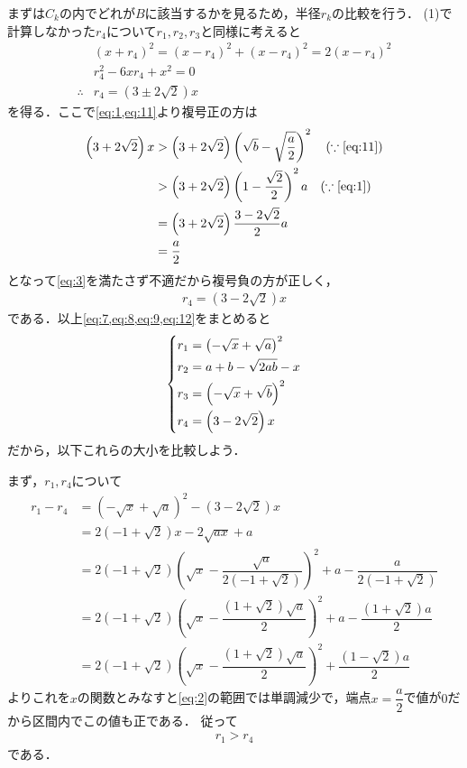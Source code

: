 \documentclass[../../main.tex]{subfiles}
\begin{document}
まずは$C_k$の内でどれが$B$に該当するかを見るため，半径$r_k$の比較を行う．
(1)で計算しなかった$r_4$について$r_1,r_2,r_3$と同様に考えると
\begin{align}
  &(x+r_4)^2 = (x-r_4)^2 + (x-r_4)^2 = 2(x-r_4)^2\\
  & r_4^2-6xr_4 + x^2 = 0 \\
  \therefore
  & r_4 = \left(3\pm 2\sqrt{2}\right) x
\end{align}
を得る．ここで\cref{eq:1,eq:11}より複号正の方は
\begin{align}
  \left(3+ 2\sqrt{2}\right) x
  & > \left(3+ 2\sqrt{2}\right)\left(\sqrt{b} - \sqrt{\dfrac{a}{2}}\right)^2 \quad (\because\text{\cref{eq:11}}) \\
  & > \left(3+ 2\sqrt{2}\right)\left(1 - \dfrac{\sqrt{2}}{2}\right)^2 a \quad (\because\text{\cref{eq:1}}) \\
  & = \left(3+ 2\sqrt{2}\right)\dfrac{3-2\sqrt{2}}{2} a  \\
  & = \dfrac{a}{2}
\end{align}
となって\cref{eq:3}を満たさず不適だから複号負の方が正しく，
\begin{align}
  r_4 = \left(3 - 2\sqrt{2}\right) x \label{eq:12}
\end{align}
である．以上\cref{eq:7,eq:8,eq:9,eq:12}をまとめると
\begin{align}
  \begin{dcases}
    r_1 = \left(-\sqrt{x} + \sqrt{a}\right)^2 \\
    r_2 = a+b-\sqrt{2ab} - x \\
    r_3 = \left(-\sqrt{x} + \sqrt{b}\right)^2 \\
    r_4 = \left(3 - 2\sqrt{2}\right) x
  \end{dcases} \label{eq:13}
\end{align}
だから，以下これらの大小を比較しよう．

まず，$r_1,r_4$について
\begin{align}
  r_1-r_4
  &= \left(-\sqrt{x} + \sqrt{a}\right)^2 - \left(3 - 2\sqrt{2}\right) x \\
  &= 2\left(-1+\sqrt{2}\right) x - 2\sqrt{ax} + a \\
  &= 2\left(-1+\sqrt{2}\right)\left(\sqrt{x} - \dfrac{\sqrt{a}}{2\left(-1+\sqrt{2}\right)}\right)^2 + a - \dfrac{a}{2\left(-1+\sqrt{2}\right)} \\
  &= 2\left(-1+\sqrt{2}\right)\left(\sqrt{x} - \dfrac{(1+\sqrt{2})\sqrt{a}}{2}\right)^2 + a - \dfrac{(1+\sqrt{2})a}{2} \\
  &= 2\left(-1+\sqrt{2}\right)\left(\sqrt{x} - \dfrac{(1+\sqrt{2})\sqrt{a}}{2}\right)^2 + \dfrac{(1-\sqrt{2})a}{2}
\end{align}
よりこれを$x$の関数とみなすと\cref{eq:2}の範囲では単調減少で，端点$x=\dfrac{a}{2}$で値が$0$だから区間内でこの値も正である．
従って
\begin{align}
  r_1 > r_4 \label{eq:14}
\end{align}
である．
\end{document}
